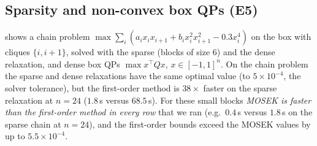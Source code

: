 \documentclass[a4paper,11pt]{article}
\newcommand{\fitbox}[1]{\sbox{\tabbox}{#1}\ifdim\wd\tabbox>\textwidth\resizebox{\textwidth}{!}{\usebox{\tabbox}}\else\usebox{\tabbox}\fi}
\theoremstyle{plain}
\theoremstyle{definition}
\theoremstyle{remark}
\begin{document}
\subsection{Sparsity and non-convex box QPs (E5)}
 shows a chain problem $\max\sum_i(a_ix_ix_{i+1}+b_ix_i^2x_{i+1}^2-0.3x_i^4)$ on the box with cliques $\{i,i+1\}$, solved with the sparse (blocks of size $6$) and the dense relaxation, and dense box QPs $\max x^\top Qx$, $x\in[-1,1]^n$. On the chain problem the sparse and dense relaxations have the same optimal value (to $5\times10^{-4}$, the solver tolerance), but the first-order method is $38\times$ faster on the sparse relaxation at $n=24$ ($1.8$\,s versus $68.5$\,s). For these small blocks \emph{MOSEK is faster than the first-order method in every row} that we ran (e.g.\ $0.4$\,s versus $1.8$\,s on the sparse chain at $n=24$), and the first-order bounds exceed the MOSEK values by up to $5.5\times10^{-4}$.
\begin{table}[t]\centering\scriptsize
\setlength{\tabcolsep}{3pt}
\fitbox{}
\caption{Correlative sparsity (chain, $r=2$) and dense non-convex box QPs.}\label{tab:e5}
\end{table}
\end{document}
